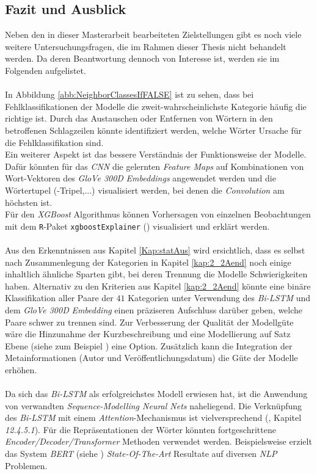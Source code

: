\documentclass[a4paper,11pt]{article}
\begin{document}
\subsection{Fazit und Ausblick}

Neben den in dieser Masterarbeit bearbeiteten Zielstellungen gibt es noch viele weitere Untersuchungsfragen, die im Rahmen dieser Thesis nicht behandelt werden. Da deren Beantwortung dennoch von Interesse ist, werden sie im Folgenden aufgelistet.\\
\\
In Abbildung \ref{abb:NeighborClassesIfFALSE} ist zu sehen, dass bei Fehlklassifikationen der Modelle die zweit-wahrscheinlichste Kategorie häufig die richtige ist. Durch das Austauschen oder Entfernen von Wörtern in den betroffenen Schlagzeilen könnte identifiziert werden, welche Wörter Ursache für die Fehlklassifikation sind.\\
Ein weiterer Aspekt ist das bessere Verständnis der Funktionsweise der Modelle. Dafür könnten für das \textit{CNN} die gelernten \textit{Feature Maps} auf Kombinationen von Wort-Vektoren des \textit{GloVe 300D} \textit{Embeddings} angewendet werden und die Wörtertupel (-Tripel,...) visualisiert werden, bei denen die \textit{Convolution} am höchsten ist.\\
Für den \textit{XGBoost} Algorithmus können Vorhersagen von einzelnen Beobachtungen mit dem \texttt{R}-Paket \texttt{xgboostExplainer} (\cite{xgBoostExplainer}) visualisiert und erklärt werden.\\
\\
Aus den Erkenntnissen aus Kapitel \ref{Kap:statAus}
wird ersichtlich, dass es selbst nach Zusammenlegung der Kategorien in Kapitel \ref{kap:2_2Aend} noch einige inhaltlich ähnliche Sparten gibt, bei deren Trennung die Modelle Schwierigkeiten haben. Alternativ zu den Kriterien aus Kapitel \ref{kap:2_2Aend} könnte eine binäre Klassifikation aller Paare der $41$ Kategorien unter Verwendung des \textit{Bi-LSTM} und dem \textit{GloVe 300D} \textit{Embedding} einen präziseren Aufschluss darüber geben, welche Paare schwer zu trennen sind. Zur Verbesserung der Qualität der Modellgüte wäre die Hinzunahme der Kurzbeschreibung und eine Modellierung auf Satz Ebene (siehe zum Beispiel \cite{sentenceRep}) eine Option. Zusätzlich kann die Integration der Metainformationen (Autor und Veröffentlichungsdatum) die Güte der Modelle erhöhen. \\
\\
Da sich das \textit{Bi-LSTM} als erfolgreichstes Modell erwiesen hat, ist die Anwendung von verwandten \textit{Sequence-Modelling Neural Nets} naheliegend. Die Verknüpfung des \textit{Bi-LSTM} mit einem \textit{Attention}-Mechanismus ist  vielversprechend (\cite{deepL}, Kapitel \textit{12.4.5.1}). Für die Repräsentationen der Wörter könnten fortgeschrittene \textit{Encoder\-/Decoder/Transformer} Methoden verwendet werden. Beispielsweise erzielt das System \textit{BERT} (siehe \cite{bert}) \textit{State-Of-The-Art} Resultate auf diversen \textit{NLP} Problemen.\\
\end{document}
